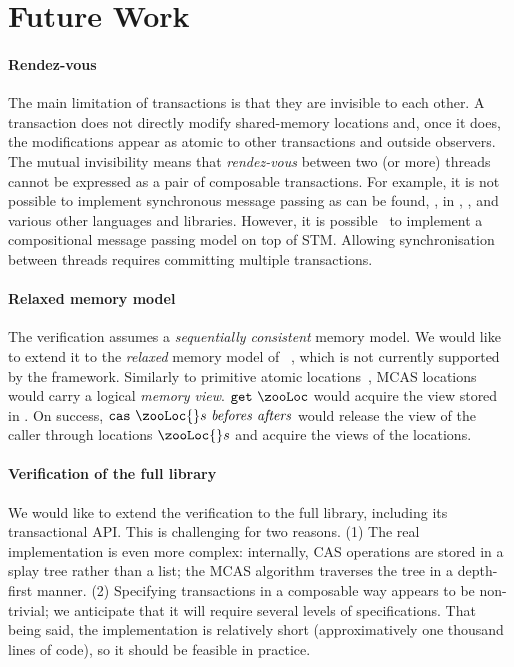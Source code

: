 \section{Future Work}
\label{sec:future_work}

\paragraph{Rendez-vous}

The main limitation of transactions is that they are invisible to each other.
A transaction does not directly modify shared-memory locations and, once it does, the modifications appear as atomic to other transactions and outside observers.
The mutual invisibility means that \emph{rendez-vous} between two (or more) threads cannot be expressed as a pair of composable transactions.
For example, it is not possible to implement synchronous message passing as can be found, \eg, in \ConcurrentML, \Go, and various other languages and libraries.
However, it is possible~\citep{DBLP:conf/wotug/Brown08,DBLP:conf/icfp/DonnellyF06} to implement a compositional message passing model on top of STM.
Allowing synchronisation between threads requires committing multiple transactions.

\paragraph{Relaxed memory model}

The verification assumes a \emph{sequentially consistent} memory model.
We would like to extend it to the \emph{relaxed} memory model of \OCamlFive~\citep{DBLP:conf/pldi/DolanSM18}, which is not currently supported by the \Zoo framework.
Similarly to primitive atomic locations~\citep{DBLP:journals/pacmpl/MevelJP20}, MCAS locations would carry a logical \emph{memory view}.
$\c{get}\ \zooLoc$ would acquire the view stored in \zooLoc.
On success, $\c{cas}\ \zooLoc{}s\ \v{befores}\ \v{afters}$ would release the view of the caller through locations $\zooLoc{}s$ and acquire the views of the locations.

\paragraph{Verification of the full library}

We would like to extend the verification to the full \Kcas library, including its transactional API.
This is challenging for two reasons.
(1) The real implementation is even more complex: internally, CAS operations are stored in a splay tree rather than a list; the MCAS algorithm traverses the tree in a depth-first manner.
(2) Specifying transactions in a composable way appears to be non-trivial; we anticipate that it will require several levels of specifications.
That being said, the implementation is relatively short (approximatively one thousand lines of code), so it should be feasible in practice.
